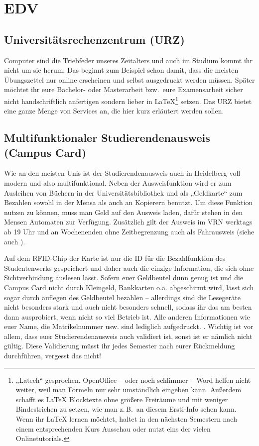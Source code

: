 \section{EDV}

\subsection{Universitätsrechenzentrum (URZ)}
\label{urz}
Computer sind die Triebfeder unseres Zeitalters und auch im Studium kommt ihr nicht um sie herum. Das beginnt zum Beispiel schon damit, dass die meisten Übungszettel nur online erscheinen und selbst ausgedruckt werden müssen. Später möchtet ihr eure Bachelor- oder Masterarbeit bzw.\ eure Examensarbeit sicher nicht handschriftlich anfertigen sondern lieber in \LaTeX \footnote{„Latech“ gesprochen. OpenOffice -- oder noch schlimmer -- Word helfen nicht weiter, weil man Formeln nur sehr umständlich eingeben kann. Außerdem schafft es \LaTeX{} Blocktexte ohne größere Freiräume und mit weniger Bindestrichen zu setzen, wie man z.\,B.\ an diesem Ersti-Info sehen kann. Wenn ihr \LaTeX{} lernen möchtet, haltet in den nächsten Semestern nach einem entsprechenden Kurs Ausschau oder nutzt eins der vielen Onlinetutorials.} setzen. Das  \gls{URZ} bietet eine ganze Menge von Services an, die hier kurz erläutert werden sollen.

\subsection*{Multifunktionaler Studierendenausweis (Campus Card)}
\label{campuscard}
Wie an den meisten Unis ist der Studierendenausweis auch in Heidelberg voll modern und also multifunktional.
Neben der Ausweisfunktion wird er zum Ausleihen von Büchern in der Universitätsbibliothek und als „Geldkarte“ zum Bezahlen sowohl in der Mensa als auch an Kopierern benutzt. Um diese Funktion nutzen zu können, muss man Geld auf den Ausweis laden, dafür stehen in den Mensen Automaten zur Verfügung.
Zusätzlich gilt der Ausweis im \gls{VRN} werktags ab 19 Uhr und an Wochenenden ohne Zeitbegrenzung auch als Fahrausweis (siehe auch ).

Auf dem RFID-Chip der Karte ist nur die ID für die Bezahlfunktion des Studentenwerks gespeichert und daher auch die einzige Information, die sich ohne Sichtverbindung auslesen lässt. Sofern euer Geldbeutel dünn genug ist und die Campus Card nicht durch Kleingeld, Bankkarten o.ä. abgeschirmt wird, lässt sich sogar durch auflegen des Geldbeutel bezahlen -- allerdings sind die Lesegeräte nicht besonders stark und auch nicht besonders schnell, sodass ihr das am besten dann ausprobiert, wenn nicht so viel Betrieb ist. Alle anderen Informationen wie euer Name, die Matrikelnummer usw. sind lediglich aufgedruckt.
.
Wichtig ist vor allem, dass euer Studierendenausweis auch validiert ist, sonst ist er nämlich nicht gültig. Diese Validierung müsst ihr jedes Semester nach eurer Rückmeldung durchführen, vergesst das nicht!

